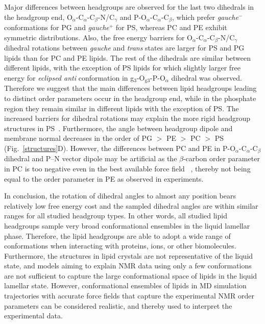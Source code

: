 \documentclass[journal=jpcbfk,manuscript=article]{achemso}
\begin{document}
Major differences between headgroups are observed for the last two dihedrals in the headgroup end,
O$_\alpha$-C$_\alpha$-C$_\beta$-N/C$_\gamma$ and P-O$_\alpha$-C$_\alpha$-C$_\beta$,
which prefer \textit{gauche$^-$} conformations for PG and \textit{gauche$^+$} for PS,
whereas PC and PE exhibit symmetric distributions.
Also, the free energy barriers for O$_\alpha$-C$_\alpha$-C$_\beta$-N/C$_\gamma$ dihedral
rotations between \textit{gauche} and \textit{trans} states are larger for
PS and PG lipids than for PC and PE lipids. 
The rest of the dihedrals are similar between different lipids,
with the exception of PS lipids for which slightly larger free energy for \textit{eclipsed anti} conformation
in g$_3$-O$_{{\mathrm g}3}$-P-O$_\alpha$ dihedral was observed.
Therefore we suggest that the main differences between lipid headgroups leading to distinct order parameters occur in the headgroup end, while in the phosphate region they remain similar in different lipids with the exception of PS. The increased barriers for dihedral rotations may explain the more rigid headgroup structures in PS~\cite{browning80,buldt81}. Furthermore, the angle between headgroup dipole and membrane normal decreases in the order of PG $>$ PE  $>$ PC  $>$ PS (Fig.~\ref{structures}D). However, the differences between PC and PE in P-O$_\alpha$-C$_\alpha$-C$_\beta$ dihedral
and P--N vector dipole may be artificial as the $\beta$-carbon order parameter in PC is too negative even in the best available force field~ \cite{botan15}, thereby not being equal to the order parameter in PE as observed in experiments.

In conclusion, the rotation of dihedral angles to almost any position bears relatively low free energy cost and the sampled dihedral angles are within similar ranges for all studied headgroup types. In other words, all studied lipid headgroups sample very broad conformational ensembles in the liquid lamellar phase. Therefore, the lipid headgroups are able to adopt a wide range of conformations when interacting with proteins, ions, or other biomolecules. Furthermore, the structures in lipid crystals \cite{buldt81,pascher92} are not representative of the liquid state, and models aiming to explain NMR data using only a few conformations \cite{seelig77c,davis83,Semchyschyn04,akutsu20} are not sufficient to capture the large conformational space of lipids in the liquid lamellar state.
However, conformational ensembles of lipids in MD simulation trajectories with accurate force fields that capture the experimental NMR order parameters can be considered realistic, and thereby used to interpret the experimental data.
\end{document}

